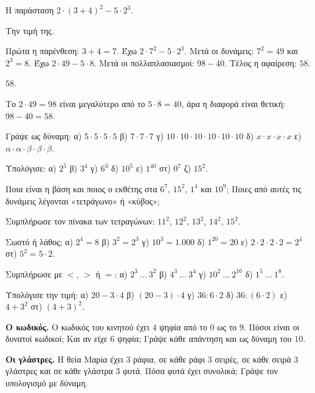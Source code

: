 \tixero Η παράσταση $2\cdot(3+4)^2-5\cdot 2^3$.\par
\tithelo Την τιμή της.\par
\possindeo Πρώτα η παρένθεση: $3+4=7$. Έχω $2\cdot 7^2-5\cdot 2^3$. Μετά οι δυνάμεις: $7^2=49$ και $2^3=8$. Έχω $2\cdot 49-5\cdot 8$. Μετά οι πολλαπλασιασμοί: $98-40$. Τέλος η αφαίρεση: $58$.\par
\apantisi $58$.\par
\elegxos Το $2\cdot 49=98$ είναι μεγαλύτερο από το $5\cdot 8=40$, άρα η διαφορά είναι θετική: $98-40=58$.



\ex Γράψε ως δύναμη: α) $5\cdot 5\cdot 5\cdot 5$ \quad β) $7\cdot 7\cdot 7$ \quad γ) $10\cdot 10\cdot 10\cdot 10\cdot 10\cdot 10$ \quad δ) $x\cdot x\cdot x\cdot x$ \quad ε) $\alpha\cdot\alpha\cdot\beta\cdot\beta\cdot\beta$.

\ex Υπολόγισε: α) $2^5$ \quad β) $3^4$ \quad γ) $6^3$ \quad δ) $10^5$ \quad ε) $1^{40}$ \quad στ) $0^7$ \quad ζ) $15^2$.

\ex Ποια είναι η βάση και ποιος ο εκθέτης στα $6^7$, $15^2$, $1^4$ και $10^9$; Ποιες από αυτές τις δυνάμεις λέγονται «τετράγωνο» ή «κύβος»;

\ex Συμπλήρωσε τον πίνακα των τετραγώνων: $11^2$, $12^2$, $13^2$, $14^2$, $15^2$.

\ex Σωστό ή λάθος; α) $2^4=8$ \quad β) $3^2=2^3$ \quad γ) $10^3=1.000$ \quad δ) $1^{20}=20$ \quad ε) $2\cdot 2\cdot 2\cdot 2=2^4$ \quad στ) $5^2=5\cdot 2$.

\ex Συμπλήρωσε με $<$, $>$ ή $=$: α) $2^3\ \dots\ 3^2$ \quad β) $4^3\ \dots\ 3^4$ \quad γ) $10^2\ \dots\ 2^{10}$ \quad δ) $1^5\ \dots\ 1^8$.

\ex Υπολόγισε την τιμή: α) $20-3\cdot 4$ \quad β) $(20-3)\cdot 4$ \quad γ) $36:6\cdot 2$ \quad δ) $36:(6\cdot 2)$ \quad ε) $4+3^2$ \quad στ) $(4+3)^2$.


\ex \textbf{Ο κωδικός.} Ο κωδικός του κινητού έχει $4$ ψηφία από το $0$ ως το $9$. Πόσοι είναι οι δυνατοί κωδικοί; Και αν είχε $6$ ψηφία; Γράψε κάθε απάντηση και ως δύναμη του $10$.

\ex \textbf{Οι γλάστρες.} Η θεία Μαρία έχει $3$ ράφια, σε κάθε ράφι $3$ σειρές, σε κάθε σειρά $3$ γλάστρες και σε κάθε γλάστρα $3$ φυτά. Πόσα φυτά έχει συνολικά; Γράψε τον υπολογισμό με δύναμη.

